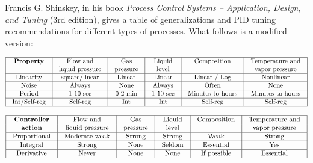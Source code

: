 

Francis G. Shinskey, in his book {\it Process Control Systems -- Application, Design, and Tuning} (3rd edition), gives a table of generalizations and PID tuning recommendations for different types of processes.  What follows is a modified version:


$$\vbox{\offinterlineskip
\halign{\strut
\vrule \quad\hfil # \ \hfil & 
\vrule \quad\hfil # \ \hfil & 
\vrule \quad\hfil # \ \hfil & 
\vrule \quad\hfil # \ \hfil & 
\vrule \quad\hfil # \ \hfil & 
\vrule \quad\hfil # \ \hfil \vrule \cr
\noalign{\hrule}
%
{\bf Property} & Flow and & Gas & Liquid & Composition & Temperature and \cr
%
 & liquid pressure & pressure & level &  & vapor pressure \cr
%
\noalign{\hrule}
%
Linearity & square/linear & Linear & Linear & Linear / Log & Nonlinear \cr
%
\noalign{\hrule}
%
Noise & Always & None & Always & Often & None \cr
%
\noalign{\hrule}
%
Period & 1-10 sec & 0-2 min & 1-10 sec & Minutes to hours & Minutes to hours \cr
%
\noalign{\hrule}
%
Int/Self-reg & Self-reg & Int & Int & Self-reg & Self-reg \cr
%
\noalign{\hrule}
} %
}$$ %


$$\vbox{\offinterlineskip
\halign{\strut
\vrule \quad\hfil # \ \hfil & 
\vrule \quad\hfil # \ \hfil & 
\vrule \quad\hfil # \ \hfil & 
\vrule \quad\hfil # \ \hfil & 
\vrule \quad\hfil # \ \hfil & 
\vrule \quad\hfil # \ \hfil \vrule \cr
\noalign{\hrule}
%
{\bf Controller} & Flow and  & Gas & Liquid & Composition & Temperature and \cr
%
{\bf action} & liquid pressure & pressure & level &  & vapor pressure \cr
%
\noalign{\hrule}
%
Proportional & Moderate-weak & Strong & Strong & Weak & Strong \cr
%
\noalign{\hrule}
%
Integral & Strong & None & Seldom & Essential & Yes \cr
%
\noalign{\hrule}
%
Derivative & Never & None & None & If possible & Essential \cr
%
\noalign{\hrule}
} %
}$$ %

